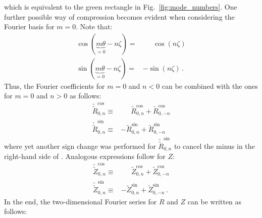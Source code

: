 which is equivalent to the green rectangle in Fig.~\ref{fig:mode_numbers}.
One further possible way of compression becomes evident when considering the Fourier basis for $m=0$.
Note that:
\begin{align}
 \cos(\underbrace{m \theta}_{=0} -n \zeta) =& \phantom{-}~ \cos(n \zeta) \label{eqn:m0cos} \\
 \sin(\underbrace{m \theta}_{=0} -n \zeta) =&          -   \sin(n \zeta) \label{eqn:m0sin} \, .
\end{align}
Thus, the Fourier coefficients for $m=0$ and $n<0$ can be combined with the ones for $m=0$ and $n>0$ as follows:
\begin{align}
 \tilde{\tilde{R}}_{0,n}^\mathrm{cos} \equiv& \phantom{-}~ \tilde{R}_{0,n}^\mathrm{cos} + \tilde{R}_{0,-n}^\mathrm{cos} \\
 \tilde{\tilde{R}}_{0,n}^\mathrm{sin} \equiv&          -   \tilde{R}_{0,n}^\mathrm{sin} + \tilde{R}_{0,-n}^\mathrm{sin}
\end{align}
where yet another sign change was performed for $\tilde{\tilde{R}}_{0,n}^\mathrm{sin}$ to cancel
the minus in the right-hand side of .
Analogous expressions follow for $Z$:
\begin{align}
 \tilde{\tilde{Z}}_{0,n}^\mathrm{cos} \equiv& \phantom{-}~ \tilde{Z}_{0,n}^\mathrm{cos} + \tilde{Z}_{0,-n}^\mathrm{cos} \\
 \tilde{\tilde{Z}}_{0,n}^\mathrm{sin} \equiv&          -   \tilde{Z}_{0,n}^\mathrm{sin} + \tilde{Z}_{0,-n}^\mathrm{sin} \, .
\end{align}
In the end, the two-dimensional Fourier series for $R$ and $Z$ can be written as follows:
